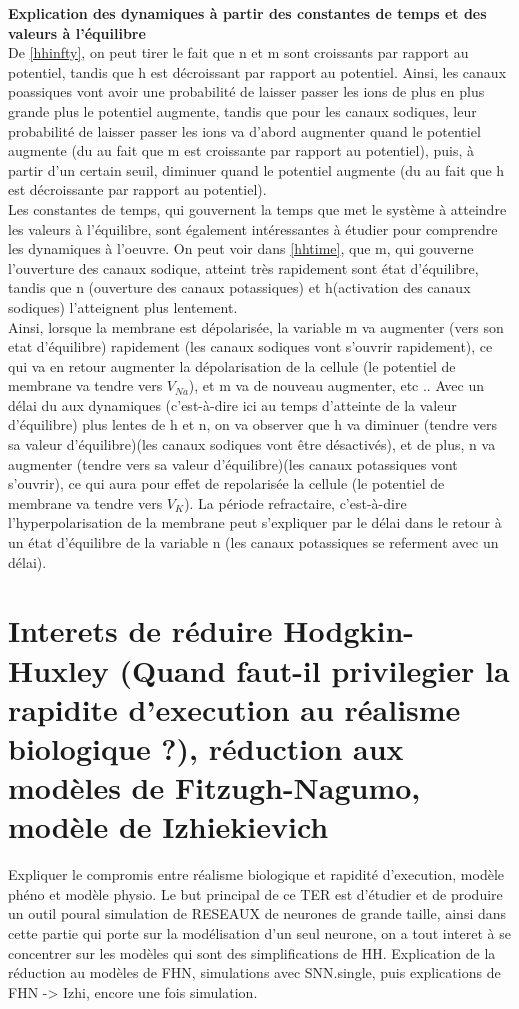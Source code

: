 \documentclass[12pt]{scrartcl}
\begin{document}
\clearpage

\textbf{Explication des dynamiques à partir des constantes de temps et des valeurs à l'équilibre}\\
De \ref{hhinfty}, on peut tirer le fait que n et m sont croissants par rapport au potentiel, tandis que h est décroissant par rapport au potentiel. Ainsi, les canaux poassiques vont avoir une probabilité de laisser passer les ions de plus en plus grande plus le potentiel augmente, tandis que pour les canaux sodiques, leur probabilité de laisser passer les ions va d'abord augmenter quand le potentiel augmente (du au fait que m est croissante par rapport au potentiel), puis, à partir d'un certain seuil, diminuer quand le potentiel augmente (du  au fait que h est décroissante par rapport au potentiel).\\
Les constantes de temps, qui gouvernent la temps que met le système à atteindre les valeurs à l'équilibre, sont également intéressantes à étudier pour comprendre les dynamiques à l'oeuvre. On peut voir dans \ref{hhtime}, que m, qui gouverne l'ouverture des canaux sodique, atteint très rapidement sont état d'équilibre, tandis que n (ouverture des canaux potassiques) et h(activation des canaux sodiques) l'atteignent plus lentement.\\
Ainsi, lorsque la membrane est dépolarisée, la variable m va augmenter (vers son etat d'équilibre) rapidement (les canaux sodiques vont s'ouvrir rapidement), ce qui va en retour augmenter la dépolarisation de la cellule (le potentiel de membrane va tendre vers $V_{Na}$), et m va de nouveau augmenter, etc .. Avec un délai du aux dynamiques (c'est-à-dire ici au temps d'atteinte de la valeur d'équilibre) plus lentes de h et n, on va observer que h va diminuer (tendre vers sa valeur d'équilibre)(les canaux sodiques vont être désactivés), et de plus, n va augmenter (tendre vers sa valeur d'équilibre)(les canaux potassiques vont s'ouvrir), ce qui aura pour effet de repolarisée la cellule (le potentiel de membrane va tendre vers $V_{K}$). La période refractaire, c'est-à-dire l'hyperpolarisation de la membrane peut s'expliquer par le délai dans le retour à un état d'équilibre de la variable n (les canaux potassiques se referment avec un délai).


\section{Interets de réduire Hodgkin-Huxley (Quand faut-il privilegier la rapidite d'execution au réalisme biologique ?), réduction aux modèles de Fitzugh-Nagumo, modèle de Izhiekievich}
	Expliquer le compromis entre réalisme biologique et rapidité d'execution, modèle phéno et modèle physio. Le but principal de ce TER est d'étudier et de produire un outil poural simulation de RESEAUX de neurones de grande taille, ainsi dans cette partie qui porte sur la modélisation d'un seul neurone, on a tout interet à se concentrer sur les modèles qui sont des simplifications de HH.
Explication de la réduction au modèles de FHN, simulations avec SNN.single, puis explications de FHN -> Izhi, encore une fois simulation.
\end{document}
